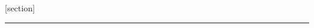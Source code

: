 [section]

\newenvironment{fibelurl}
{\refstepcounter{fibelurlctr}[\arabic{fibelurlctr}]~}
{\par}

\newcommand{\pullquotenl}{\par~}


\newlength{\temp}

{\vspace{-0.6cm}%
%
\rule[2.6mm]{0.96\linewidth}{0.5mm}%
}

\newcommand{\fibelmargin}{\Large Ersti-$\Phi$bel \fibeljahr}


\renewcommand{\Re}{\operatorname{Re}}
\renewcommand{\Im}{\operatorname{Im}}

\newcommand{\NN}{\mathbb{N}}
\newcommand{\ZZ}{\mathbb{Z}}
\newcommand{\QQ}{\mathbb{Q}}
\newcommand{\RR}{\mathbb{R}}
\newcommand{\CC}{\mathbb{C}}
\newcommand{\abs}[1]{\left\lvert #1 \right\rvert}
\newcommand{\norm}[1]{\left\lVert#1\right\rVert}
\newcommand{\arsinh}{\operatorname{arsinh}}
\newcommand{\arcosh}{\operatorname{arcosh}}
\newcommand{\artanh}{\operatorname{artanh}}

\makeatletter
\newcommand*{\diff}%
		{\@ifnextchar^{\DIfF}{\DIfF^{}}}
\def\DIfF^#1{%
		\mathop{\mathrm{\mathstrut d}}%
			\nolimits^{#1}\gobblespace
}
\def\gobblespace{%
        \futurelet\diffarg\opspace}
\def\opspace{%
        \let\DiffSpace\!%
        \ifx\diffarg(%
                \let\DiffSpace\relax
        \else
                \ifx\diffarg[%
                        \let\DiffSpace\relax
                \else
                        \ifx\diffarg\{%
                                \let\DiffSpace\relax
                        \fi\fi\fi\DiffSpace}

